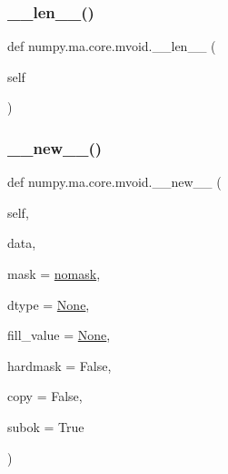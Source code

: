 \mbox{\label{classnumpy_1_1ma_1_1core_1_1mvoid_a61c15faff554c267735e0b5dbc992189}} 
\subsubsection{\texorpdfstring{\+\_\+\+\_\+len\+\_\+\+\_\+()}{\_\_len\_\_()}}
{\footnotesize\ttfamily def numpy.\+ma.\+core.\+mvoid.\+\_\+\+\_\+len\+\_\+\+\_\+ (\begin{DoxyParamCaption}\item[{}]{self }\end{DoxyParamCaption})}

\mbox{\label{classnumpy_1_1ma_1_1core_1_1mvoid_a90e35d035fa17ef1dbe3ce1b414677d7}} 
\subsubsection{\texorpdfstring{\+\_\+\+\_\+new\+\_\+\+\_\+()}{\_\_new\_\_()}}
{\footnotesize\ttfamily def numpy.\+ma.\+core.\+mvoid.\+\_\+\+\_\+new\+\_\+\+\_\+ (\begin{DoxyParamCaption}\item[{}]{self,  }\item[{}]{data,  }\item[{}]{mask = {\ttfamily \hyperlink{namespacenumpy_1_1ma_1_1core_abafbbb38c7afc60936cc5a55fa23ecfa}{nomask}},  }\item[{}]{dtype = {\ttfamily \hyperlink{namespacenumpy_1_1ma_1_1core_a647ee1848dfa3692fe35a663a2aa40b3}{None}},  }\item[{}]{fill\+\_\+value = {\ttfamily \hyperlink{namespacenumpy_1_1ma_1_1core_a647ee1848dfa3692fe35a663a2aa40b3}{None}},  }\item[{}]{hardmask = {\ttfamily False},  }\item[{}]{copy = {\ttfamily False},  }\item[{}]{subok = {\ttfamily True} }\end{DoxyParamCaption})}

